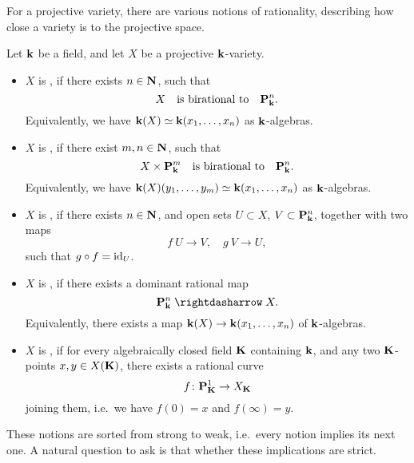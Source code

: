 For a projective variety, there are various notions
of rationality, describing how close a variety is to the projective space.

\begin{definition}
    Let $\bbk$ be a field,
    and let $X$ be a projective $\bbk$-variety.
    \begin{itemize}
        \item
            $X$ is ,
            if there exists $n \in \bbN$, such that 
            \[ X \quad \text{is birational to} \quad \bbP_{\bbk}^n. \]
            Equivalently, we have
            $\bbk(X) \simeq \bbk(x_1, \dotsc, x_n)$ as $\bbk$-algebras.

        \item 
            $X$ is ,
            if there exist $m, n \in \bbN$, such that
            \[ X \times \bbP_{\bbk}^m \quad \text{is birational to} \quad \bbP_{\bbk}^n. \]
            Equivalently, we have
            $\bbk(X)(y_1, \dotsc, y_m) \simeq \bbk(x_1, \dotsc, x_n)$ as $\bbk$-algebras.

        \item
            $X$ is ,
            if there exists $n \in \bbN$, and open sets $U \subset X$, $V \subset \bbP_{\bbk}^n$,
            together with two maps 
            \[ 
                f \: U \to V, \quad
                g \: V \to U,
            \]
            such that $g \circ f = \mathrm{id}_U$. 

        \item
            $X$ is , 
            if there exists a dominant rational map 
            \[ \bbP_{\bbk}^n \mathrel{\rightdasharrow} X. \]
            Equivalently, there exists a map 
            $\bbk(X) \to \bbk(x_1, \dotsc, x_n)$ of $\bbk$-algebras.

        \item
            $X$ is ,
            if for every algebraically closed field $\bbK$ containing $\bbk$,
            and any two $\bbK$-points $x, y \in X(\bbK)$,
            there exists a rational curve 
            \[ f \: \bbP_{\bbK}^1 \to X_{\bbK} \]
            joining them, i.e.\ we have $f(0) = x$ and $f(\infty) = y$.
    \end{itemize}
\end{definition}

These notions are sorted from strong to weak,
i.e.\ every notion implies its next one.
A natural question to ask is that whether these implications are strict.

